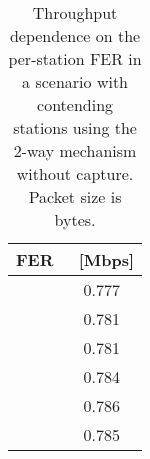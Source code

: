 \documentclass[10pt,onecolumn,a4paper]{IEEEtran}
\begin{document}
\begin{table}\caption{Throughput dependence on the per-station FER in a scenario with 
contending stations using the 2-way mechanism without capture.
Packet size is  bytes.}
\begin{center}
\begin{tabular}{c|c}
\hline \hline  FER & ~[Mbps]\\ \hline \hline
  & 0.777\\
\hline
  & 0.781 \\
\hline
 & 0.781 \\
\hline \hline
  & 0.784  \\
\hline
  & 0.786 \\
\hline
  & 0.785 \\
\hline \hline
\end{tabular}
 \label{tab.throughput_per}
\end{center}
\end{table}
\end{document}
